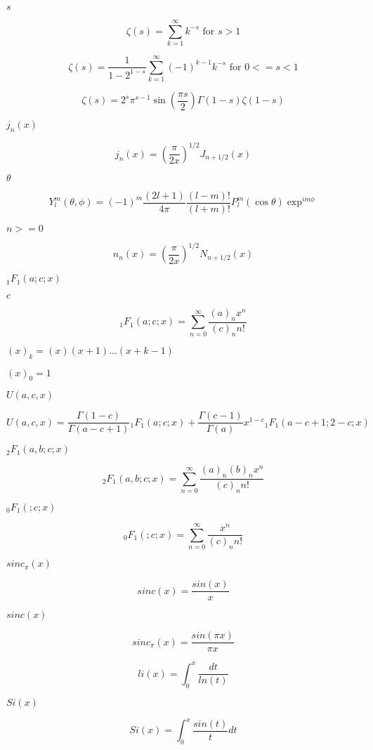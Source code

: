 \documentclass{article}
\begin{document}
$ s $
\pagebreak

\[ \zeta(s) = \sum_{k=1}^{\infty} k^{-s} \mbox{ for } s > 1 \]
\pagebreak

\[ \zeta(s) = \frac{1}{1-2^{1-s}}\sum_{k=1}^{\infty}(-1)^{k-1}k^{-s} \mbox{ for } 0 <= s < 1 \]
\pagebreak

\[ \zeta(s) = 2^s \pi^{s-1} \sin(\frac{\pi s}{2}) \Gamma(1-s) \zeta(1-s) \]
\pagebreak

$ j_n(x) $
\pagebreak

\[ j_n(x) = \left(\frac{\pi}{2x} \right) ^{1/2} J_{n+1/2}(x) \]
\pagebreak

$ \theta $
\pagebreak

\[ Y_l^m(\theta,\phi) = (-1)^m\frac{(2l+1)}{4\pi} \frac{(l-m)!}{(l+m)!} P_l^m(\cos\theta) \exp^{im\phi} \]
\pagebreak

$ n >= 0 $
\pagebreak

\[ n_n(x) = \left(\frac{\pi}{2x} \right) ^{1/2} N_{n+1/2}(x) \]
\pagebreak

$ {}_1F_1(a;c;x) $
\pagebreak

$ c $
\pagebreak

\[ {}_1F_1(a;c;x) = \sum_{n=0}^{\infty} \frac{(a)_n x^n}{(c)_n n!} \]
\pagebreak

$ (x)_k = (x)(x+1)...(x+k-1) $
\pagebreak

$ (x)_0 = 1 $
\pagebreak

$ U(a,c,x) $
\pagebreak

\[ U(a,c,x) = \frac{\Gamma(1-c)}{\Gamma(a-c+1)} {}_1F_1(a;c;x) + \frac{\Gamma(c-1)}{\Gamma(a)} x^{1-c} {}_1F_1(a-c+1;2-c;x) \]
\pagebreak

$ {}_2F_1(a,b;c;x) $
\pagebreak

\[ {}_2F_1(a,b;c;x) = \sum_{n=0}^{\infty} \frac{(a)_n (b)_n x^n}{(c)_n n!} \]
\pagebreak

$ {}_0F_1(;c;x) $
\pagebreak

\[ {}_0F_1(;c;x) = \sum_{n=0}^{\infty} \frac{x^n}{(c)_n n!} \]
\pagebreak

$ sinc_\pi(x) $
\pagebreak

\[ sinc(x) = \frac{sin(x)}{x} \]
\pagebreak

$ sinc(x) $
\pagebreak

\[ sinc_\pi(x) = \frac{sin(\pi x)}{\pi x} \]
\pagebreak

\[ li(x) = \int_0^x \frac{dt}{ln(t)} \]
\pagebreak

$ Si(x) $
\pagebreak

\[ Si(x) = \int_0^x \frac{sin(t)}{t}dt \]
\pagebreak
\end{document}
